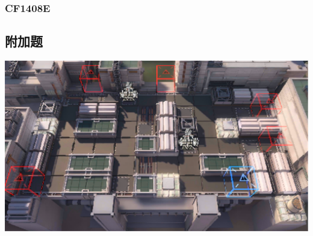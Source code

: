 \subsubsection{CF1408E}

\clearpage
\subsection{附加题}
\centerline{\includegraphics[scale=0.685,angle=270]{other/map.png}}